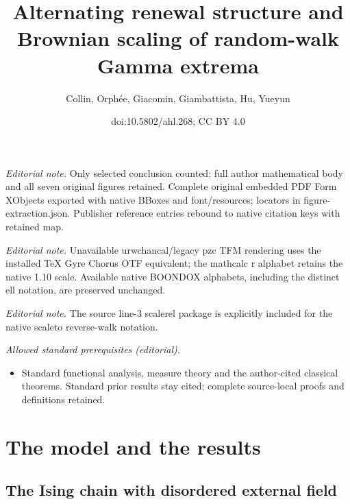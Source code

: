 \documentclass[10pt]{amsart}
\title{Alternating renewal structure and Brownian scaling of random-walk Gamma extrema}
\author{Collin, Orphée, Giacomin, Giambattista, Hu, Yueyun}
\date{doi:10.5802/ahl.268; CC BY 4.0}
\theoremstyle{definition}\newtheorem{defi}[theo]{Definition}\newtheorem{rema}[theo]{Remark}\newtheorem{exam}[theo]{Example}\newtheorem{exem}[theo]{Example}\newtheorem{nota}[theo]{Notation}
\begin{document}
\maketitle
\noindent\textit{Editorial note.} Only selected conclusion counted; full author mathematical body and all seven original figures retained. Complete original embedded PDF Form XObjects exported with native BBoxes and font/resources; locators in figure-extraction.json. Publisher reference entries rebound to native citation keys with retained map.\par\medskip
\noindent\textit{Editorial note.} Unavailable urwchancal/legacy pzc TFM rendering uses the installed TeX Gyre Chorus OTF equivalent; the mathcalc r alphabet retains the native 1.10 scale. Available native BOONDOX alphabets, including the distinct ell notation, are preserved unchanged.\par\medskip
\noindent\textit{Editorial note.} The source line-3 scalerel package is explicitly included for the native scaleto reverse-walk notation.\par\medskip
\noindent\textit{Allowed standard prerequisites (editorial).}\begin{itemize}
\item Standard functional analysis, measure theory and the author-cited classical theorems. Standard prior results stay cited; complete source-local proofs and definitions retained.
\end{itemize}\medskip


\section{The model and the results}\label{sec:intro}

\subsection{The Ising chain with disordered external field}\label{sec:model}
\end{document}
